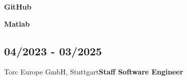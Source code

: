 \documentclass{classic}
\begin{document}
\begin{paracol}{2}
        \begin{minipage}[c]{0.31\textwidth}
            \begin{flushright}
                {\bfseries GitHub}\\
                {\footnotesize \href{https://github.com/chandramouli6890/}{}}
            \end{flushright}
        \end{minipage}
        \begin{minipage}{0.05\textwidth}
            \githubIcon
        \end{minipage}
        \vspace{3mm}


        \begin{minipage}[c]{0.31\textwidth}
            \begin{flushright}
                {\bfseries Matlab}\\
                {\footnotesize
                    \href{https://de.mathworks.com/matlabcentral/profile/authors/4267772}{}}
            \end{flushright}
        \end{minipage}
        \begin{minipage}{0.05\textwidth}
            \matlabIcon
        \end{minipage}

\switchcolumn

{
    \subsection{04/2023 - 03/2025}{Torc Europe GmbH, Stuttgart}{\bfseries Staff Software Engineer}
          \begin{itemize}


\end{itemize}}
\end{paracol}
\end{document}
